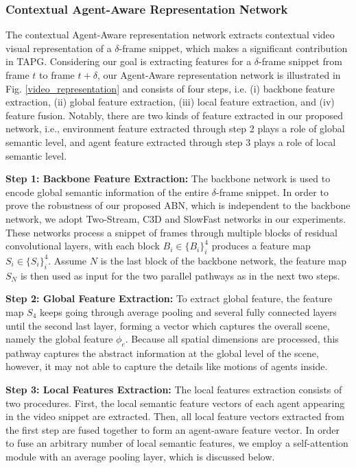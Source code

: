 \documentclass{ieeeaccess}
\begin{document}
\subsubsection{Contextual Agent-Aware Representation Network}
\label{subsec:representation} 
The contextual Agent-Aware representation network extracts contextual video visual representation of a $\delta$-frame snippet, which makes a significant contribution in TAPG. Considering our goal is extracting features for a $\delta$-frame snippet from frame $t$ to frame $t + \delta$, our Agent-Aware representation network is illustrated in Fig. \ref{video_representation} and consists of four steps, i.e. (i) backbone feature extraction, (ii) global feature extraction, (iii) local feature extraction, and (iv) feature fusion. Notably, there are two kinds of feature extracted in our proposed network, i.e., environment feature extracted through step 2 plays a role of global semantic level, and agent feature extracted through step 3 plays a role of local semantic level.


\textbf{Step 1: Backbone Feature Extraction:}
 The backbone network is used to encode global semantic information of the entire $\delta$-frame snippet. In order to prove the robustness of our proposed ABN, which is independent to the backbone network, we adopt Two-Stream, C3D \cite{C3D_3} and SlowFast \cite{SlowFast} networks in our experiments. These networks process a snippet of frames through multiple blocks of residual convolutional layers, with each block $B_i \in \{B_i\}_i^4$ produces a feature map $S_i \in \{S_i\}_i^4$. Assume $N$ is the last block of the backbone network, the feature map $S_N$ is then used as input for the two parallel pathways as in the next two steps.
 




\textbf{Step 2: Global Feature Extraction:}
To extract global feature, the feature map $S_4$ keeps going through average pooling and several fully connected layers until the second last layer, forming a vector which captures the overall scene, namely the global feature $\phi_e$. Because all spatial dimensions are processed, this pathway captures the abstract information at the global level of the scene, however, it may not able to capture the details like motions of agents inside.

\textbf{Step 3: Local Features Extraction:}
The local features extraction consists of two procedures. First, the local semantic feature vectors of each agent appearing in the video snippet are extracted. Then, all local feature vectors extracted from the first step are fused together to form an agent-aware feature vector. In order to fuse an arbitrary number of local semantic features, we employ a self-attention module with an average pooling layer, which is discussed below. 
\end{document}
